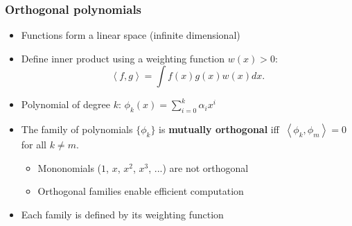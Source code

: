 \documentclass[bigger,handout]{beamer}
\begin{document}
\begin{frame}%
\frametitle{Orthogonal polynomials}

\begin{itemize}
\item Functions form a linear space (infinite dimensional)

\item Define inner product using a weighting function $w(x)>0$:%
\begin{equation*}
\left\langle f,g\right\rangle =\int f(x)g(x)w(x)dx.
\end{equation*}

\item Polynomial of degree $k$: $\phi _{k}\left( x\right)
=\sum_{i=0}^{k}\alpha _{i}x^{i}$

\item The family of polynomials $\{\phi _{k}\}$ is \textbf{mutually
orthogonal} \newline
iff $\ \left\langle \phi _{k},\phi _{m}\right\rangle =0$ for all $k\neq m$.

\begin{itemize}
\item Mononomials ($1$, $x$, $x^{2}$, $x^{3}$, ...) are not orthogonal
\item Orthogonal families enable efficient computation
\end{itemize}

\item Each family is defined by its weighting function
\end{itemize}


\end{frame}%
\end{document}

